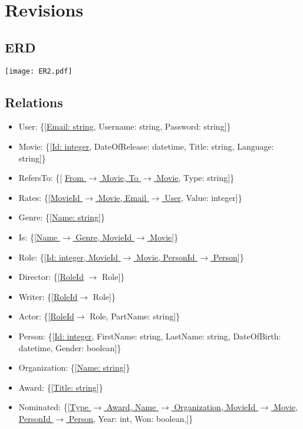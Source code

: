 \section{Revisions}

\subsection{ERD}
\texttt{[image: ER2.pdf]}

\subsection{Relations}
\begin{itemize}
\item User: \{[\underline{Email: string}, Username: string, Password: string]\}

\item Movie: \{[\underline{Id: integer}, DateOfRelease: datetime, Title: string, Language: string]\}

\item RefersTo: \{[ \underline{From $\rightarrow$ Movie, To $\rightarrow$ Movie}, Type: string]\}

\item Rates: \{[\underline{MovieId $\rightarrow$ Movie, Email $ \rightarrow $ User}, Value: integer]\}

\item Genre: \{[\underline{Name: string}]\}

\item Is: \{[\underline{Name $\rightarrow$ Genre, MovieId $\rightarrow$ Movie}]\}

\item Role: \{[\underline{Id: integer, MovieId $\rightarrow$ Movie, PersonId $ \rightarrow $ Person}]\}

\item Director: \{[\underline{RoleId} $ \rightarrow $ Role]\}

\item Writer: \{[\underline{RoleId}$ \rightarrow $ Role]\}

\item Actor: \{[\underline{RoleId}$ \rightarrow $ Role, PartName: string]\}

\item Person: \{[\underline{Id: integer}, FirstName: string, LastName: string, DateOfBirth: datetime, Gender: boolean]\}

\item Organization: \{[\underline{Name: string}]\}

\item Award: \{[\underline{Title: string}]\}

\item Nominated: \{[\underline{Type $ \rightarrow $ Award, Name $ \rightarrow $ Organization, MovieId $\rightarrow$ Movie,}\\
\underline{PersonId $ \rightarrow $ Person}, Year: int, Won: boolean,]\}
\end{itemize}

